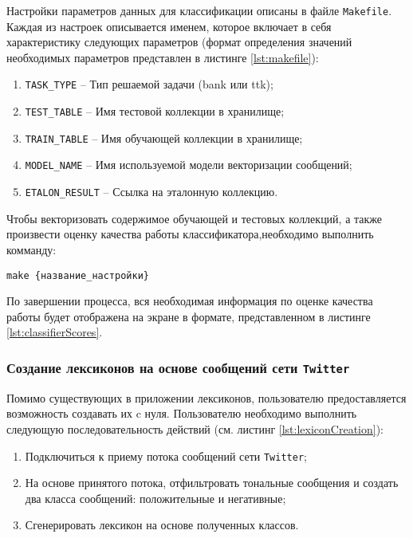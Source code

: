         Настройки параметров данных для классификации описаны в файле {\tt Makefile}.
        Каждая из настроек описывается именем, которое включает в себя
        характеристику следующих параметров (формат определения значений необходимых
        параметров представлен в листинге \ref{lst:makefile}):

        \begin{enumerate}
            \item {\tt TASK\_TYPE} -- Тип решаемой задачи ({bank} или {ttk});
            \item {\tt TEST\_TABLE} -- Имя тестовой коллекции в хранилище;
            \item {\tt TRAIN\_TABLE} -- Имя обучающей коллекции в хранилище;
            \item {\tt MODEL\_NAME} -- Имя используемой модели векторизации сообщений;
            \item {\tt ETALON\_RESULT} -- Ссылка на эталонную коллекцию.
        \end{enumerate}

        \lstset{style=bash}
        

        Чтобы векторизовать содержимое обучающей и тестовых коллекций, а также
        произвести оценку качества работы классификатора,необходимо выполнить
        комманду:
        \begin{center}
            {\tt make {\{название\_настройки\}}}
        \end{center}

        По завершении процесса, вся необходимая информация по оценке качества
        работы будет отображена на экране в формате, представленном в листинге
        \ref{lst:classifierScores}.


        \subsubsection{Создание лексиконов на основе сообщений сети
            {\tt Twitter} }
        Помимо существующих в приложении лексиконов, пользователю предоставляется
        возможность создавать их c нуля. Пользователю необходимо выполнить следующую
        последовательность действий (см. листинг \ref{lst:lexiconCreation}):
        \begin{enumerate}
            \item Подключиться к приему потока сообщений сети {\tt Twitter};
            \item На основе принятого потока, отфильтровать тональные сообщения
            и создать два класса сообщений: положительные и негативные;
            \item Сгенерировать лексикон на основе полученных классов.
        \end{enumerate}

        \lstset{style=bash}
        
